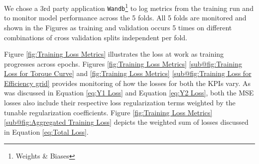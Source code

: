 \documentclass{report} %
\begin{document}
We chose a 3rd party application \texttt{Wandb}\footnote{Weights \& Biases} to log metrics from the training run and to monitor model performance across the 5 folds.
All 5 folds are monitored and shown in the Figures as training and validation occurs 5 times on different combinations of cross validation splits independent per fold.

Figure \ref{fig:Training Loss Metrics} illustrates the loss at work as training progresses across epochs. 
Figures \ref{fig:Training Loss Metrics} \ref{sub@fig:Training Loss for Torque Curve} and \ref{fig:Training Loss Metrics} \ref{sub@fig:Training Loss for Efficiency grid} 
provides monitoring of how the losses for both the \ac{KPI}s vary. As was discussed in Equation \ref{eq:Y1 Loss} and Equation \ref{eq:Y2 Loss}, both the \ac{MSE} losses 
also include their respective loss regularization terms weighted by the tunable regularization coefficients. 
Figure \ref{fig:Training Loss Metrics} \ref{sub@fig:Aggregated Training Loss} depicts the weighted sum of losses 
discussed in Equation \ref{eq:Total Loss}.
\end{document}
